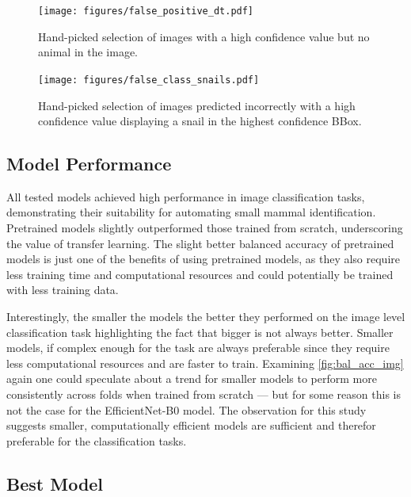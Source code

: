 \begin{figure}[ht]
\centering
\texttt{[image: figures/false\_positive\_dt.pdf]}
\caption{Hand-picked selection of images with a high confidence value but no animal in the image.}
\label{fig:false_positive_dt}
\end{figure}

\begin{figure}[ht]
\centering
\texttt{[image: figures/false\_class\_snails.pdf]}
\caption{Hand-picked selection of images predicted incorrectly with a high confidence value displaying a snail in the highest confidence BBox.}
\label{fig:false_class_snails}
\end{figure}

\subsection{Model Performance}
All tested models achieved high performance in image classification tasks, demonstrating their suitability for automating small mammal identification.
Pretrained models slightly outperformed those trained from scratch, underscoring the value of transfer learning.
The slight better balanced accuracy of pretrained models is just one of the benefits of using pretrained models, as they also require less training time and computational resources and could potentially be trained with less training data.

Interestingly, the smaller the models the better they performed on the image level classification task highlighting the fact that bigger is not always better.
Smaller models, if complex enough for the task are always preferable since they require less computational resources and are faster to train.
Examining \autoref{fig:bal_acc_img} again one could speculate about a trend for smaller models to perform more consistently across folds when trained from scratch --- but for some reason this is not the case for the EfficientNet-B0 model.
The observation for this study suggests smaller, computationally efficient models are sufficient and therefor preferable for the classification tasks.

\subsection{Best Model}

